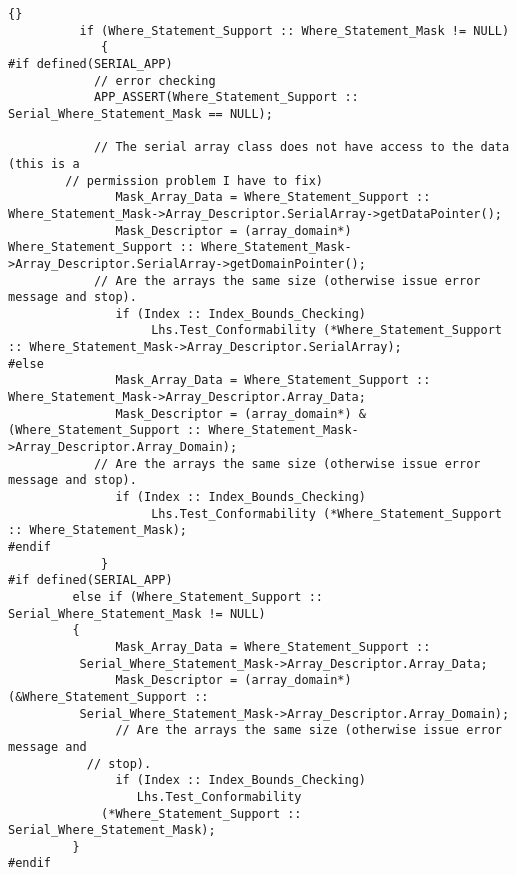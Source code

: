 \documentclass[10pt]{llncs}
\begin{document}
\begin{lstlisting}{}
          if (Where_Statement_Support :: Where_Statement_Mask != NULL)
             {
#if defined(SERIAL_APP)
            // error checking
            APP_ASSERT(Where_Statement_Support :: Serial_Where_Statement_Mask == NULL);

            // The serial array class does not have access to the data (this is a 
	    // permission problem I have to fix) 
               Mask_Array_Data = Where_Statement_Support :: Where_Statement_Mask->Array_Descriptor.SerialArray->getDataPointer();
               Mask_Descriptor = (array_domain*) Where_Statement_Support :: Where_Statement_Mask->Array_Descriptor.SerialArray->getDomainPointer();
            // Are the arrays the same size (otherwise issue error message and stop).
               if (Index :: Index_Bounds_Checking)
                    Lhs.Test_Conformability (*Where_Statement_Support :: Where_Statement_Mask->Array_Descriptor.SerialArray);
#else
               Mask_Array_Data = Where_Statement_Support :: Where_Statement_Mask->Array_Descriptor.Array_Data;
               Mask_Descriptor = (array_domain*) &(Where_Statement_Support :: Where_Statement_Mask->Array_Descriptor.Array_Domain);
            // Are the arrays the same size (otherwise issue error message and stop).
               if (Index :: Index_Bounds_Checking)
                    Lhs.Test_Conformability (*Where_Statement_Support :: Where_Statement_Mask);
#endif
             }
#if defined(SERIAL_APP)
	     else if (Where_Statement_Support :: Serial_Where_Statement_Mask != NULL)
	     {
               Mask_Array_Data = Where_Statement_Support :: 
		  Serial_Where_Statement_Mask->Array_Descriptor.Array_Data;
               Mask_Descriptor = (array_domain*)(&Where_Statement_Support :: 
		  Serial_Where_Statement_Mask->Array_Descriptor.Array_Domain);
               // Are the arrays the same size (otherwise issue error message and 
	       // stop).
               if (Index :: Index_Bounds_Checking)
                  Lhs.Test_Conformability 
		     (*Where_Statement_Support :: Serial_Where_Statement_Mask);
	     }
#endif


\end{lstlisting}
\end{document}
